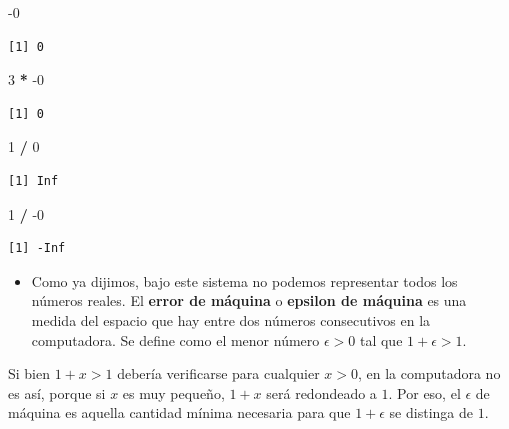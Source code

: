 \documentclass[]{book}
\newenvironment{Shaded}{\begin{snugshade}}{\end{snugshade}}
\newcommand{\DecValTok}[1]{\textcolor[rgb]{0.00,0.00,0.81}{#1}}
\newcommand{\OperatorTok}[1]{\textcolor[rgb]{0.81,0.36,0.00}{\textbf{#1}}}
\newcommand{\StringTok}[1]{\textcolor[rgb]{0.31,0.60,0.02}{#1}}
\providecommand{\tightlist}{%
  \setlength{\itemsep}{0pt}\setlength{\parskip}{0pt}}
\begin{document}
\begin{Shaded}
\begin{Highlighting}[]
\DecValTok{-0}
\end{Highlighting}
\end{Shaded}

\begin{verbatim}
[1] 0
\end{verbatim}

\begin{Shaded}
\begin{Highlighting}[]
\DecValTok{3} \OperatorTok{*}\StringTok{ }\DecValTok{-0}
\end{Highlighting}
\end{Shaded}

\begin{verbatim}
[1] 0
\end{verbatim}

\begin{Shaded}
\begin{Highlighting}[]
\DecValTok{1} \OperatorTok{/}\StringTok{ }\DecValTok{0}
\end{Highlighting}
\end{Shaded}

\begin{verbatim}
[1] Inf
\end{verbatim}

\begin{Shaded}
\begin{Highlighting}[]
\DecValTok{1} \OperatorTok{/}\StringTok{ }\DecValTok{-0}
\end{Highlighting}
\end{Shaded}

\begin{verbatim}
[1] -Inf
\end{verbatim}

\begin{itemize}
\tightlist
\item
  Como ya dijimos, bajo este sistema no podemos representar todos los números reales. El \textbf{error de máquina} o \textbf{epsilon de máquina} es una medida del espacio que hay entre dos números consecutivos en la computadora. Se define como el menor número \(\epsilon > 0\) tal que \(1 + \epsilon > 1\).
\end{itemize}

Si bien \(1 + x > 1\) debería verificarse para cualquier \(x > 0\), en la computadora no es así, porque si \(x\) es muy pequeño, \(1 + x\) será redondeado a \(1\). Por eso, el \(\epsilon\) de máquina es aquella cantidad mínima necesaria para que \(1 + \epsilon\) se distinga de \(1\).
\end{document}
